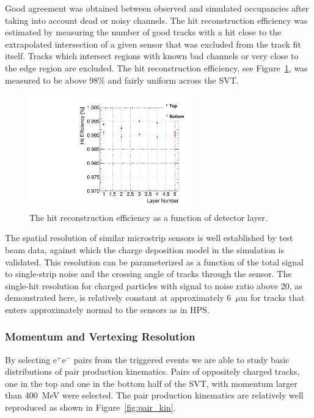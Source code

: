 \documentclass[final,3p,times,twocolumn]{elsarticle}
\newcommand{\ee}{e$^+$e$^-$}
\begin{document}
Good agreement was obtained between observed and simulated occupancies after taking into account dead or 
noisy channels. The hit reconstruction efficiency was estimated by measuring 
the number of good tracks with a hit close to the extrapolated intersection of a given sensor that was 
excluded from the track fit itself. Tracks which intersect regions with known bad channels or very close 
to the edge region are excluded. The hit reconstruction efficiency, see Figure~\ref{fig:hit_efficiency}, 
was measured to be above 98\% and fairly uniform across the SVT.
\begin{figure}[]
\begin{center}
{\small
    	\includegraphics[width=7cm]{figures/single_hit_efficiency_Omar_11192013.pdf}
        \caption{ The hit reconstruction efficiency as a function of detector layer.}
	\label{fig:hit_efficiency}
}
\end{center}
\end{figure}


The spatial resolution of similar microstrip sensors is well established by test beam data, against which 
the charge deposition model in the simulation is validated.  This resolution can be parameterized as a 
function of the total signal to single-strip noise and the crossing angle of tracks through the sensor.  
The single-hit resolution for charged particles with signal to noise ratio above 20, as demonstrated 
here, is relatively constant at approximately 6~$\mu$m for tracks that enters approximately normal to 
the sensors as in HPS.



\subsubsection{Momentum and Vertexing Resolution}

By selecting \ee{} pairs from the triggered events we are able to study basic distributions of pair 
production kinematics. Pairs of oppositely charged tracks, one in the top and one in the bottom half of 
the SVT, with momentum larger than 400~MeV were selected. The pair production kinematics are 
relatively well reproduced as shown in Figure~\ref{fig:pair_kin}. 
\end{document}
